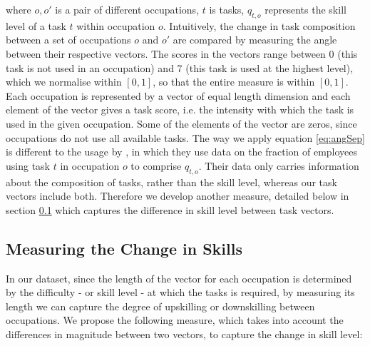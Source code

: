 \documentclass[11pt, oneside]{article}
\begin{document}
	\noindent where $o,o'$ is a pair of different occupations, $t$ is tasks, $q_{t,o}$ represents the skill level of a task $t$ within occupation $o$. Intuitively, the change in task composition between a set of occupations $o$ and $o'$ are compared by measuring the angle between their respective vectors. The scores in the vectors range between 0 (this task is not used in an occupation) and 7 (this task is used at the highest level), which we normalise within $[0,1]$, so that the entire measure is within $[0,1]$. Each occupation is represented by a vector of equal length dimension and each element of the vector gives a task score, i.e. the intensity with which the task is used in the given occupation. Some of the elements of the vector are zeros, since occupations do not use all available tasks. 
	The way we apply equation \ref{eq:angSep} is different to the usage by \cite{Gathmann2010}, in which they use data on the fraction of employees using task $t$ in occupation $o$ to comprise $q_{t,o}$. Their data only carries information about the composition of tasks, rather than the skill level, whereas our task vectors include both. Therefore we develop another measure, detailed below in section \ref{sec:changeSkillLevel} which captures the difference in skill level between task vectors.
	
	
	
	\begin{comment}
	\begin{figure}[H]
	\centering
	\begin{minipage}{.4\textwidth}
	\centering
	\begin{tabular}{lc} %
	& \\
	\end{tabular}
	\end{minipage}
	\begin{minipage}{.4\textwidth}
	\centering
	\begin{tabular}{lc} %
	& \\
	\end{tabular}
	\end{minipage}
	\caption{Quantiles of task similarity of potential occupational moves across (left) and within (right) 1-digit SOC codes (including zeros)}
	\label{fig:angSep_quantile}
	\end{figure}
	\end{comment}
	
	\subsection{Measuring the Change in Skills}
	\label{sec:changeSkillLevel}
	In our dataset, since the length of the vector for each occupation is determined by the difficulty - or skill level - at which the tasks is required, by measuring its length we can capture the degree of upskilling or downskilling between occupations. We propose the following measure, which takes into account the differences in magnitude between two vectors, to capture the change in skill level: 
	
\end{document}

